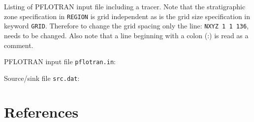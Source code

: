 \documentclass[12pt]{article}
\begin{document}
Listing of PFLOTRAN input file including a tracer. Note that the stratigraphic zone specification in {\tt REGION} is grid independent as is the grid size specification in keyword {\tt GRID}. Therefore to change the grid spacing only the line: {\tt NXYZ 1 1 136}, needs to be changed. Also note that a line beginning with a colon (:) is read as a comment.

\bigskip

\noindent PFLOTRAN input file {\tt pflotran.in}: 
\footnotesize


\clearpage

\normalsize
\noindent
Source/sink file {\tt src.dat}:
\footnotesize

\normalsize


\section{References}
\end{document}
